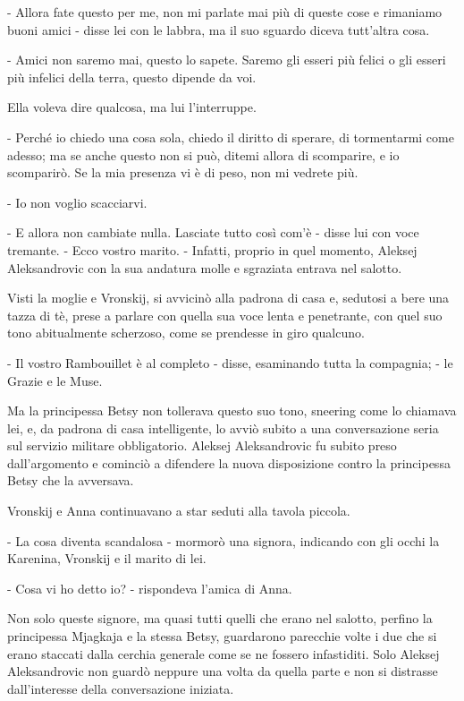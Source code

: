 - Allora fate questo per me, non mi parlate mai più di queste cose e rimaniamo buoni amici - disse lei con le labbra, ma il suo sguardo diceva tutt'altra cosa. 

- Amici non saremo mai, questo lo sapete. Saremo gli esseri più felici o gli esseri più infelici della terra, questo dipende da voi. 

Ella voleva dire qualcosa, ma lui l'interruppe. 

- Perché io chiedo una cosa sola, chiedo il diritto di sperare, di tormentarmi come adesso; ma se anche questo non si può, ditemi allora di scomparire, e io scomparirò. Se la mia presenza vi è di peso, non mi vedrete più. 

- Io non voglio scacciarvi. 

- E allora non cambiate nulla. Lasciate tutto così com'è - disse lui con voce tremante. - Ecco vostro marito. - Infatti, proprio in quel momento, Aleksej Aleksandrovic con la sua andatura molle e sgraziata entrava nel salotto. 

Visti la moglie e Vronskij, si avvicinò alla padrona di casa e, sedutosi a bere una tazza di tè, prese a parlare con quella sua voce lenta e penetrante, con quel suo tono abitualmente scherzoso, come se prendesse in giro qualcuno. 

- Il vostro Rambouillet è al completo - disse, esaminando tutta la compagnia; - le Grazie e le Muse. 

Ma la principessa Betsy non tollerava questo suo tono, sneering come lo chiamava lei, e, da padrona di casa intelligente, lo avviò subito a una conversazione seria sul servizio militare obbligatorio. Aleksej Aleksandrovic fu subito preso dall'argomento e cominciò a difendere la nuova disposizione contro la principessa Betsy che la avversava. 

Vronskij e Anna continuavano a star seduti alla tavola piccola. 

- La cosa diventa scandalosa - mormorò una signora, indicando con gli occhi la Karenina, Vronskij e il marito di lei. 

- Cosa vi ho detto io? - rispondeva l'amica di Anna. 

Non solo queste signore, ma quasi tutti quelli che erano nel salotto, perfino la principessa Mjagkaja e la stessa Betsy, guardarono parecchie volte i due che si erano staccati dalla cerchia generale come se ne fossero infastiditi. Solo Aleksej Aleksandrovic non guardò neppure una volta da quella parte e non si distrasse dall'interesse della conversazione iniziata. 


